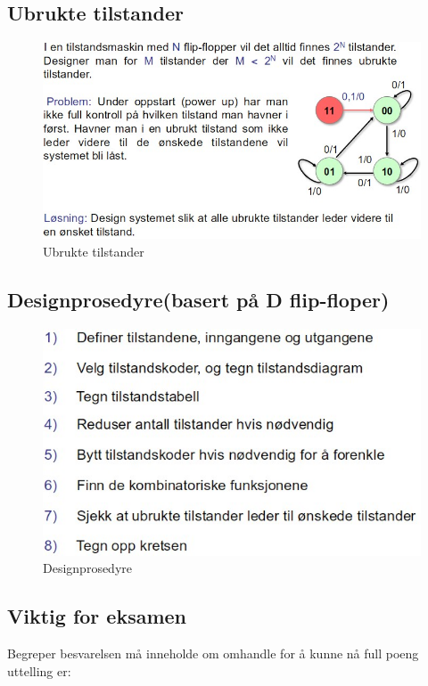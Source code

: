\documentclass{article}
\begin{document}
	\subsection{Ubrukte tilstander}
	\begin{figure}[H]
		\includegraphics[scale = 0.6]{ubrukt.jpg}
		\caption{Ubrukte tilstander}
	\end{figure}
	
	\subsection{Designprosedyre(basert på D flip-floper)}
	\begin{figure}[H]
		\includegraphics[scale = 0.6]{prosedyre.jpg}
		\caption{Designprosedyre}
	\end{figure}
	
	\subsection{Viktig for eksamen}
	Begreper besvarelsen må inneholde om omhandle for å kunne nå full poeng uttelling er: 
	
\end{document}
